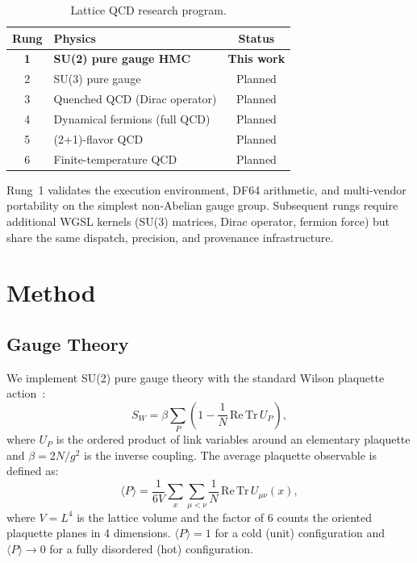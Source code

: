 \documentclass[aps,prl,twocolumn,superscriptaddress,showpacs]{revtex4-2}
\begin{document}
\begin{table}[h]
\caption{Lattice QCD research program.}
\label{tab:ladder}
\begin{ruledtabular}
\begin{tabular}{clc}
Rung & Physics & Status \\
\midrule
\textbf{1} & \textbf{SU(2) pure gauge HMC} & \textbf{This work} \\
2 & SU(3) pure gauge & Planned \\
3 & Quenched QCD (Dirac operator) & Planned \\
4 & Dynamical fermions (full QCD) & Planned \\
5 & (2+1)-flavor QCD & Planned \\
6 & Finite-temperature QCD & Planned \\
\end{tabular}
\end{ruledtabular}
\end{table}

Rung~1 validates the execution environment, DF64 arithmetic, and
multi-vendor portability on the simplest non-Abelian gauge group.
Subsequent rungs require additional WGSL kernels (SU(3) matrices,
Dirac operator, fermion force) but share the same dispatch, precision,
and provenance infrastructure.

\section{Method}
\label{sec:method}

\subsection{Gauge Theory}

We implement SU(2) pure gauge theory with the standard Wilson plaquette
action~\cite{wilson1974}:
\begin{equation}
  S_W = \beta \sum_P \left(1 - \frac{1}{N}\,\mathrm{Re}\,\mathrm{Tr}\, U_P\right),
  \label{eq:wilson}
\end{equation}
where $U_P$ is the ordered product of link variables around an elementary
plaquette and $\beta = 2N/g^2$ is the inverse coupling. The average
plaquette observable is defined as:
\begin{equation}
  \langle P \rangle = \frac{1}{6V} \sum_{x} \sum_{\mu < \nu}
    \frac{1}{N}\,\mathrm{Re}\,\mathrm{Tr}\, U_{\mu\nu}(x),
  \label{eq:plaquette}
\end{equation}
where $V = L^4$ is the lattice volume and the factor of 6 counts the
oriented plaquette planes in 4 dimensions. $\langle P \rangle = 1$ for a
cold (unit) configuration and $\langle P \rangle \to 0$ for a fully
disordered (hot) configuration.
\end{document}
